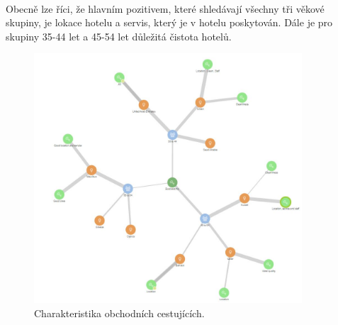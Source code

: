 \documentclass[czech,BP]{thesiskiv}
\begin{document}
\\
Obecně lze říci, že hlavním pozitivem, které shledávají všechny tři věkové skupiny, je lokace hotelu a servis, který je v hotelu poskytován. Dále je pro skupiny 35-44 let a 45-54 let důležitá čistota hotelů.
\begin{figure}[htbp]
	\centering
	\includegraphics[width = 10cm]{img/Business_trip_customers_proportions.jpg}
	\caption{Charakteristika obchodních cestujících.}
	\label{fig:Business}	
\end{figure}
\newpage
\end{document}
